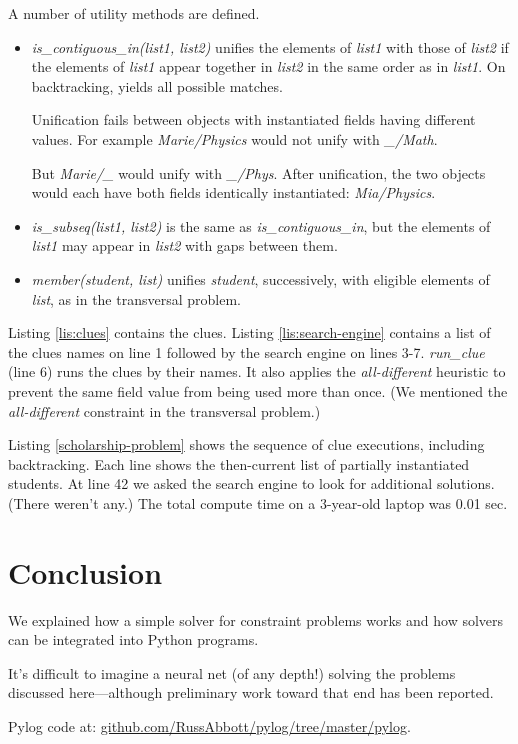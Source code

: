 A number of utility methods are defined.
\begin{itemize}
    \item \textit{is\_contiguous\_in(list1, list2)} unifies the elements of \textit{list1} with those of \textit{list2} if the elements of \textit{list1} appear together in \textit{list2} in the same order as in \textit{list1}. On backtracking, yields all possible matches. 
    
    \smallv
    Unification fails between objects with instantiated fields having different values. For example \textit{Marie/Physics} would not unify with \textit{\_/Math}.
    
    \smallv
    But \textit{Marie/\_} would unify with \textit{\_/Phys}. After unification, the two objects would each have both fields identically instantiated: \textit{Mia/Physics}.
    
    \item \textit{is\_subseq(list1, list2)} is the same as \textit{is\_contiguous\_in}, but the elements of \textit{list1} may appear in \textit{list2} with gaps between them.
    \item \textit{member(student, list)} unifies \textit{student}, successively, with eligible elements of \textit{list}, as in the transversal problem.
\end{itemize}

Listing \ref{lis:clues} contains the clues. Listing \ref{lis:search-engine} contains a list of the clues names on line 1 followed by the search engine on lines 3-7.  \textit{run\_clue} (line 6) runs the clues by their names. It also applies the \textit{all-different} heuristic to prevent the same field value from being used more than once. (We mentioned the \textit{all-different} constraint in the transversal problem.)

Listing \ref{scholarship-problem} shows the sequence of clue executions, including backtracking. Each line shows the then-current list of partially instantiated students. At line 42 we asked the search engine to look for additional solutions. (There weren't any.) The total compute time on a 3-year-old laptop was 0.01 sec. 

\section{Conclusion} \label{sec:conclusion}

We explained how a simple solver for constraint problems works and how solvers can be integrated into Python programs. 

It's difficult to imagine a neural net (of any depth!) solving the problems discussed here---although preliminary work toward that end has been reported. \cite{xu2018towards, amel2019shallow, dubois2019towards}

\mediumv
\noindent Pylog code at: %
\href{https://github.com/RussAbbott/pylog/tree/master/pylog}{github.com/RussAbbott/pylog/tree/master/pylog}.

